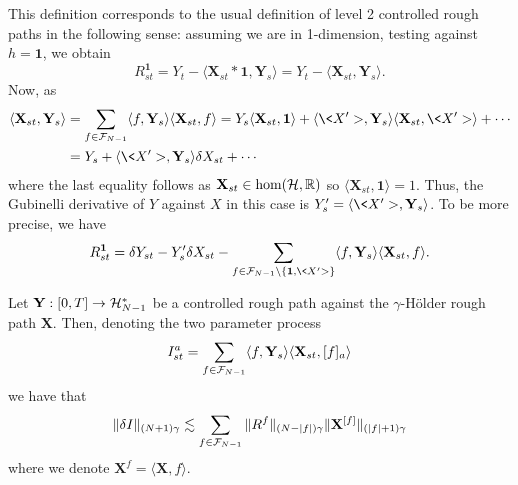 \documentclass[11pt]{style/preprint}
\begin{document}
This definition corresponds to the usual definition of level 2 controlled rough paths in the following sense: 
assuming we are in 1-dimension, testing against \(h = \mathbf{1}\), we obtain
\[R^{\mathbf{1}}_{st} = Y_t - \langle \mathbf{X}_{st} * \mathbf{1}, \mathbf{Y}_s\rangle 
  = Y_t - \langle \mathbf{X}_{st}, \mathbf{Y}_s\rangle.\]
Now, as 
\begin{align*}
  \langle \mathbf{X}_{st}, \mathbf{Y}_s\rangle 
  & = \sum_{f \in \CF_{N - 1}} \langle f, \mathbf{Y}_s\rangle \langle \mathbf{X}_{st}, f\rangle
    = Y_s \langle \mathbf{X}_{st}, \mathbf{1}\rangle 
      + \langle \<X'>, \mathbf{Y}_s\rangle \langle \mathbf{X}_{st}, \<X'>\rangle + \cdots\\
  & = Y_s + \langle \<X'>, \mathbf{Y}_s\rangle \delta X_{st} + \cdots
\end{align*}
where the last equality follows as \(\mathbf{X}_{st} \in \hom({\mathcal H}, \mathbb{R})\) so 
\(\langle \mathbf{X}_{st}, \mathbf{1}\rangle = 1\). Thus, the Gubinelli derivative of \(Y\) against 
\(X\) in this case is \(Y'_s = \langle \<X'>, \mathbf{Y}_s\rangle\). To be more precise, we have 
\[R^{\mathbf{1}}_{st} = \delta Y_{st} - Y'_s \delta X_{st} - 
  \sum_{f \in \CF_{N - 1} \setminus \{\mathbf{1}, \<X'>\}} \langle f, \mathbf{Y}_s\rangle \langle \mathbf{X}_{st}, f\rangle.\]
\begin{proposition}
  Let \(\mathbf{Y} : [0, T] \to {\mathcal H}^*_{N - 1}\) be a controlled rough path against the \(\gamma\)-H\"older 
  rough path \(\mathbf{X}\). Then, denoting the two parameter process
  \[I_{st}^a = \sum_{f \in {\mathcal F}_{N - 1}} \langle f, \mathbf{Y}_s\rangle \langle \mathbf{X}_{st}, [f]_a\rangle\] 
  we have that 
  \[\|\delta I\|_{(N + 1)\gamma} \lesssim \sum_{f \in {\mathcal F}_{N - 1}} \|R^f\|_{(N - |f|)\gamma} \|\mathbf{X}^{[f]}\|_{(|f| + 1)\gamma}\]
  where we denote \(\mathbf{X}^f = \langle \mathbf{X}, f\rangle\).
\end{proposition}
\end{document}
